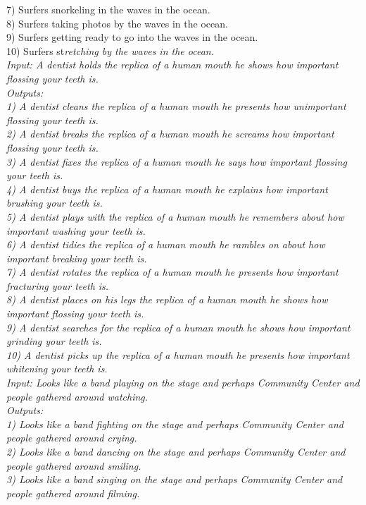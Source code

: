 {7) Surfers snorkeling in the waves in the ocean. \\
8) Surfers taking photos by the waves in the ocean. \\
9) Surfers getting ready to go into the waves in the ocean. \\
10) Surfers st}\textit{retching by the waves in the ocean. \\
Input: A dentist holds the replica of a human mouth he shows how important flossing your teeth is. \\
Outputs:\\
1) A dentist cleans the replica of a human mouth he presents how unimportant flossing your teeth is. \\
2) A dentist breaks the replica of a human mouth he screams how important flossing your teeth is.\\
3) A dentist fixes the replica of a human mouth he says how important flossing your teeth is. \\
4) A dentist buys the replica of a human mouth he explains how important brushing your teeth is. \\
5) A dentist plays with the replica of a human mouth he remembers about how important washing your teeth is. \\
6) A dentist tidies the replica of a human mouth he rambles on about how important breaking your teeth is. \\
7) A dentist rotates the replica of a human mouth he presents how important fracturing your teeth is. \\
8) A dentist places on his legs the replica of a human mouth he shows how important flossing your teeth is.\\
9) A dentist searches for the replica of a human mouth he shows how important grinding your teeth is. \\
10) A dentist picks up the replica of a human mouth he presents how important whitening your teeth is. \\
Input: Looks like a band playing on the stage and perhaps Community Center and people gathered around watching. \\
Outputs: \\
1) Looks like a band fighting on the stage and perhaps Community Center and people gathered around crying. \\
2) Looks like a band dancing on the stage and perhaps Community Center and people gathered around smiling. \\
3) Looks like a band singing on the stage and perhaps Community Center and people gathered around filming. \\
}

